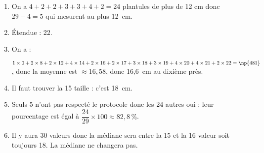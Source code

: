 
\medskip 

% 
%
% 
%
%
%
 
\begin{enumerate}
\item %
On a $4 + 2 + 2 + 3 + 3 + 4 + 2 = 24$ plantules de plus de 12 cm donc $29 - 4 = 5$ qui mesurent au plus 12~cm.
\item %
Étendue : 22. 
\item %
On a : 

$1\times 0 + 2\times8 + 2\times12 + 4\times14 + 2\times16 + 2\times17 + 3\times18 + 3\times19 + 4\times20 + 4 \times 21 + 2\times 22 = \np{481}$, donc la moyenne est $\approx 16,58$, donc 16,6~cm au dixième près. 
\item %
Il faut trouver la 15 taille : c'est 18~cm. 
\item %
 
Seuls 5 n'ont pas respecté le protocole donc  les 24 autres oui ; leur pourcentage est égal à $\dfrac{24}{29} \times 100 \approx 82,8\,\%$.
\item %
 
Il y aura 30 valeurs donc la médiane sera entre la 15 et la 16 valeur soit toujours 18.
La médiane ne changera pas. 
\end{enumerate}

\bigskip


